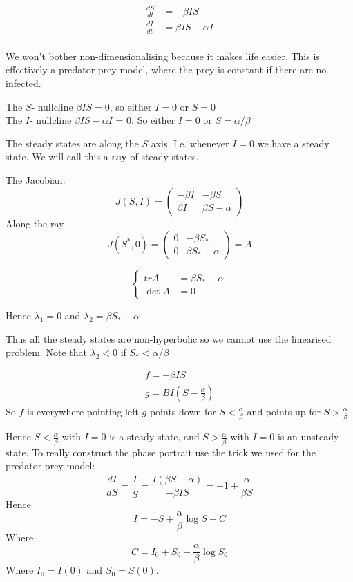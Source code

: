 \documentclass{X:/Documents/Coding/Latex/myassignment}
\begin{document}
\begin{align*}
    \frac{dS}{dt} &=-\beta IS\\
    \frac{dI}{dt} &=\beta IS - \alpha I \\
\end{align*}

We won't bother non-dimensionalising because it makes life easier. This is effectively a predator prey model, where the prey is constant if there are no infected.


The $S$- nullcline $\beta IS = 0$, so either $I=0$ or $S=0$\\
The $I$- nullcline $\beta IS - \alpha I$ = 0. So either $I=0$ or $S = \alpha/\beta$


The steady states are along the $S$ axis. I.e. whenever $I=0$ we have a steady state. We will call this a \textbf{ray} of steady states.


The Jacobian:
\[J(S,I) = \begin{pmatrix}
    -\beta I & -\beta S\\ \beta I & \beta S - \alpha
\end{pmatrix}\]
Along the ray 
\[J(S^*,0) = \begin{pmatrix}
    0& -\beta S_*\\
    0 & \beta S_* - \alpha
\end{pmatrix} = A\]

\[\begin{cases}
    trA &= \beta S_* - \alpha\\
    \det A &= 0
\end{cases}\]

Hence $\lambda_1 = 0$ and $\lambda_2 = \beta S_* - \alpha$

Thus all the steady states are non-hyperbolic so we cannot use the linearised problem.
Note that $\lambda_2 < 0 $ if $S_* < \alpha/\beta$

\begin{align*}
    f=  -\beta IS\\
    g = BI(S-\frac{\alpha}\beta)
\end{align*}
So $f$ is everywhere pointing left
$g$ points down for $S < \frac \alpha \beta$ and points up for $S > \frac \alpha \beta$

Hence $S < \frac \alpha \beta$ with $I=0$ is a steady state, and $S > \frac \alpha \beta$ with $I=0$ is an unsteady state.
To really construct the phase portrait use the trick we used for the predator prey model:
\[\frac{dI}{dS} = \frac{\dot{I}}{\dot{S}} = \frac{I(\beta S - \alpha)}{-\beta IS} = -1 + \frac{\alpha}{\beta S}\]
Hence
\[I = -S + \frac{\alpha}\beta \log S + C\]
Where
\[C = I_0 + S_0 - \frac{\alpha}\beta \log S_0\]
Where $I_0 = I(0)$ and $S_0 = S(0)$. 
\end{document}
